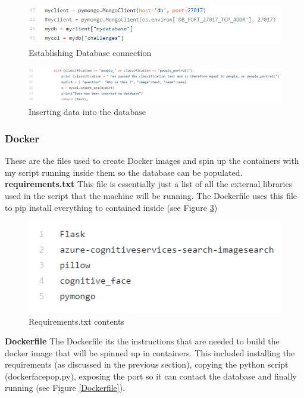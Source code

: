 \documentclass[12pt,a4paper]{article}
\begin{document}
\begin{figure}[!ht]
    \centering
    \includegraphics[width=1.0\textwidth]{Figs/dbinsert1.PNG} 
    \caption{Establishing Database connection} 
    \label{dbinsert1}
\end{figure}  

\begin{figure}[!ht]
    \centering
    \includegraphics[width=1.0\textwidth]{Figs/dbinsert2.PNG} 
    \caption{Inserting data into the database} 
    \label{dbinsert2}
\end{figure} 

\subsubsection{Docker}   
These are the files used to create Docker images and spin up the containers with my script running inside them so the database can be populated. 
\textbf{requirements.txt}   
This file is essentially just a list of all the external libraries used in the script that the machine will be running. The Dockerfile uses this file to pip install everything to contained inside (see Figure \ref{req}) 

\begin{figure}[!ht]
    \centering
    \includegraphics[width=1.0\textwidth]{Figs/requirements.PNG} 
    \caption{Requirements.txt contents} 
    \label{req}
\end{figure} 

\textbf{Dockerfile} 
The Dockerfile its the instructions that are needed to build the docker image that will be spinned up in containers.  This included installing the requirements (as discussed in the previous section), copying the python script (docker\textunderscore face\textunderscore pop.py), exposing the port so it can contact the database and finally running (see Figure \ref{Dockerfile}). 
\end{document}
